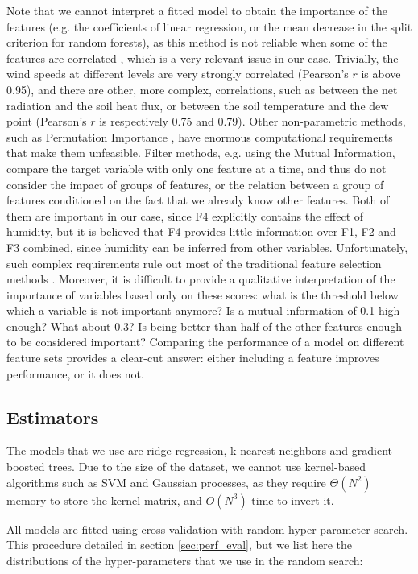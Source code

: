 \documentclass[a4paper,11pt]{kth-mag}
\begin{document}
Note that we cannot interpret a fitted model to obtain the importance of the features (e.g. the coefficients of linear regression, or the mean decrease in the split criterion for random forests), as this method is not reliable when some of the features are correlated \citep{rf_bias,rf_corr_imp}, which is a very relevant issue in our case. Trivially, the wind speeds at different levels are very strongly correlated (Pearson's $r$ is above 0.95), and there are other, more complex, correlations, such as between the net radiation and the soil heat flux, or between the soil temperature and the dew point (Pearson's $r$ is respectively 0.75 and 0.79). Other non-parametric methods, such as Permutation Importance \citep{permutation_importance}, have enormous computational requirements that make them unfeasible. Filter methods, e.g. using the Mutual Information, compare the target variable with only one feature at a time, and thus do not consider the impact of groups of features, or the relation between a group of features conditioned on the fact that we already know other features. Both of them are important in our case, since F4 explicitly contains the effect of humidity, but it is believed that F4 provides little information over F1, F2 and F3 combined, since humidity can be inferred from other variables. Unfortunately, such complex requirements rule out most of the traditional feature selection methods \citep{fsel}. Moreover, it is difficult to provide a qualitative interpretation of the importance of variables based only on these scores: what is the threshold below which a variable is not important anymore? Is a mutual information of 0.1 high enough? What about 0.3? Is being better than half of the other features enough to be considered important? Comparing the performance of a model on different feature sets provides a clear-cut answer: either including a feature improves performance, or it does not.


\subsection{Estimators}
The models that we use are ridge regression, k-nearest neighbors and gradient boosted trees. Due to the size of the dataset, we cannot use kernel-based algorithms such as SVM and Gaussian processes, as they require $\Theta(N^2)$ memory to store the kernel matrix, and $O(N^3)$ time to invert it.

All models are fitted using cross validation with random hyper-parameter search. This procedure detailed in section \ref{sec:perf_eval}, but we list here the distributions of the hyper-parameters that we use in the random search:
\end{document}
